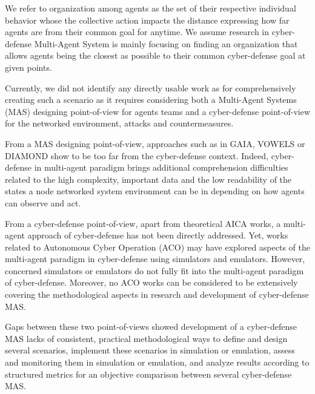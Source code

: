 \documentclass[conference]{IEEEtran}
\begin{document}
We refer to organization among agents as the set of their respective individual behavior whose the collective action impacts the distance expressing how far agents are from their common goal for anytime. We assume research in cyber-defense Multi-Agent System is mainly focusing on finding an organization that allows agents being the closest as possible to their common cyber-defense goal at given points.

Currently, we did not identify any directly usable work as for comprehensively creating such a scenario as it requires considering both a Multi-Agent Systems (MAS) designing point-of-view for agents teams and a cyber-defense point-of-view for the networked environment, attacks and countermeasures.

From a MAS designing point-of-view, approaches such as in GAIA\cite{wooldridge2000gaia}, VOWELS\cite{demazeau2002} or DIAMOND\cite{jamont2007} show to be too far from the cyber-defense context. Indeed, cyber-defense in multi-agent paradigm brings additional comprehension difficulties related to the high complexity, important data and the low readability of the states a node networked system environment can be in depending on how agents can observe and act.

From a cyber-defense point-of-view, apart from theoretical AICA works, a multi-agent approach of cyber-defense has not been directly addressed. Yet, works related to Autonomous Cyber Operation (ACO) may have explored aspects of the multi-agent paradigm in cyber-defense using simulators and emulators\cite{Veksler2018-mc,vyas2023automated}. However, concerned simulators or emulators do not fully fit into the multi-agent paradigm of cyber-defense. Moreover, no ACO works can be considered to be extensively covering the methodological aspects in research and development of cyber-defense MAS.

Gaps between these two point-of-views showed development of a cyber-defense MAS lacks of consistent, practical methodological ways to define and design several scenarios, implement these scenarios in simulation or emulation, assess and monitoring them in simulation or emulation, and analyze results according to structured metrics for an objective comparison between several cyber-defense MAS.
\end{document}
